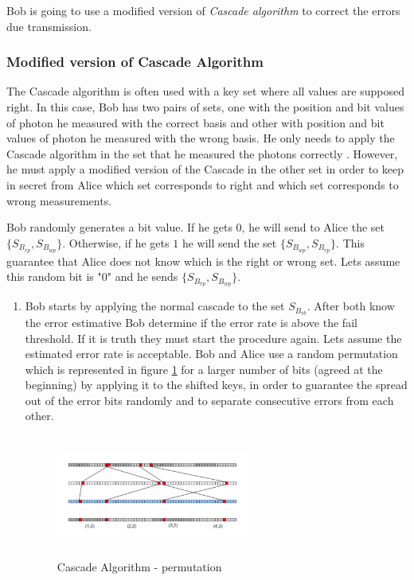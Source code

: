 \begin{enumerate}
      Bob is going to use a modified version of \textit{Cascade algorithm} to correct the errors due transmission.

      \subsubsection{Modified version of Cascade Algorithm}
      The Cascade algorithm is often used with a key set where all values are supposed right. In this case, Bob has two pairs of sets, one with the position and bit values of photon he measured with the correct basis and other with position and bit values of photon he measured with the wrong basis. He only needs to apply the Cascade algorithm in the set that he measured the photons correctly \cite{Brassard1994}. However, he must apply a modified version of the Cascade in the other set in order to keep in secret from Alice which set corresponds to right and which set corresponds to wrong measurements.

      Bob randomly generates a bit value. If he gets $0$, he will send to Alice the set $\{ S_{B_{rp}}, S_{B_{wp}}\}$. Otherwise, if he gets $1$ he will send the set $\{S_{B_{wp}}, S_{B_{rp}}\}$. This guarantee that Alice does not know which is the right or wrong set. Lets assume this random bit is "0" and he sends $\{S_{B_{rp}}, S_{B_{wp}}\}$.

      \begin{enumerate}
        \item Bob starts by applying the normal cascade to the set $S_{B_{rb}}$. After both know the error estimative Bob determine if the error rate is above the fail threshold. If it is truth they must start the procedure again. Lets assume the estimated error rate is acceptable. Bob and Alice use a random permutation which is represented in figure \ref{cascadepermutation} for a larger number of bits (agreed at the beginning) by applying it to the shifted keys, in order to guarantee the spread out of the error bits randomly and to separate consecutive errors from each other.

            \begin{figure}[h]
            	\centering
            	\includegraphics[width=0.6\textwidth, height=4cm]{./sdf/ot_with_discrete_variables/figures/cascade_permutation.png}
                	\caption{Cascade Algorithm - permutation}\label{cascadepermutation}
            \end{figure}


\end{enumerate}
\end{enumerate}
